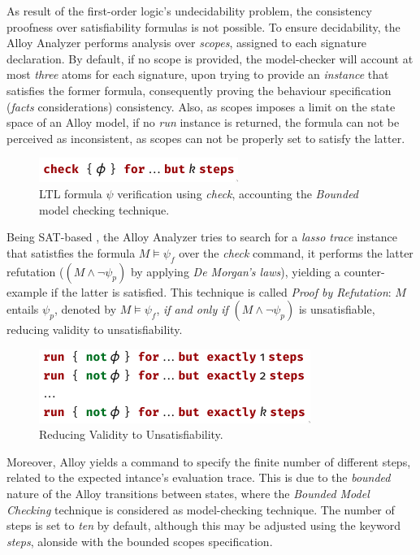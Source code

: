 As result of the first-order logic's undecidability problem, the consistency proofness over satisfiability formulas is not possible. \cite{vakili2012temporal} To ensure decidability, the Alloy Analyzer performs analysis over \textit{scopes}, assigned to each signature declaration. By default, if no scope is provided, the model-checker will account at most \textit{three} atoms for each signature, upon trying to provide an \textit{instance} that satisfies the former formula, consequently proving the behaviour specification (\textit{facts} considerations) consistency. Also, as scopes imposes a limit on the state space of an Alloy model, if no \textit{run} instance is returned, the formula can not be perceived as inconsistent, as scopes can not be properly set to satisfy the latter.

\begin{figure}[H]
    \centering
    \includegraphics[width=0.4\linewidth]{images/check_alloy_1.png}
    \caption{LTL formula $\psi$ verification using \textit{check}, accounting the \textit{Bounded} model checking technique.}
    \label{fig:alloy-check-1}
\end{figure}

Being SAT-based \cite{lwspecification}, the Alloy Analyzer tries to search for a \textit{lasso trace} instance that satistfies the formula $M \models \psi_{f}$ over the \textit{check} command, it performs the latter refutation ($(M \wedge \neg \psi_{p})$ by applying \textit{De Morgan's laws}), yielding a counter-example if the latter is satisfied. This technique is called \textit{Proof by Refutation}: $M$ entails $\psi_{p}$, denoted by $M \models \psi_{f}$, \textit{if and only if} $(M \wedge \neg \psi_{p})$ is unsatisfiable, reducing validity to unsatisfiability.

\begin{figure}[H]
    \centering
    \includegraphics[width=0.5\linewidth]{images/check_alloy_2.png}
    \caption{Reducing Validity to Unsatisfiability.}
    \label{fig:alloy-check-2}
\end{figure}

Moreover, Alloy yields a command to specify the finite number of different steps, related to the expected intance's evaluation trace. This is due to the \textit{bounded} nature of the Alloy transitions between states, where the \textit{Bounded Model Checking} technique is considered as model-checking technique. The number of steps is set to \textit{ten} by default, although this may be adjusted using the keyword \textit{steps}, alonside with the bounded scopes specification. 

